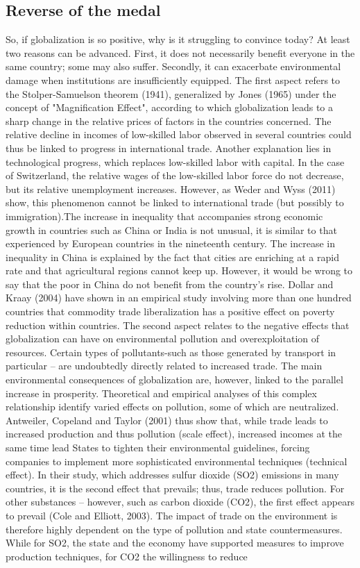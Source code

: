 \documentclass[12pt]{article}
\begin{document}
\subsection{Reverse of the medal}

So, if globalization is so positive, why is it struggling to convince today? At least two reasons can be advanced. First, it does not necessarily benefit everyone in the same country; some may also suffer. Secondly, it can exacerbate environmental damage when institutions are insufficiently equipped. The first aspect refers to the Stolper-Samuelson theorem (1941), generalized by Jones (1965) under the concept of "Magnification Effect", according to which globalization leads to a sharp change in the relative prices of factors in the countries concerned. The relative decline in incomes of low-skilled labor observed in several countries could thus be linked to progress in international trade. Another explanation lies in technological progress, which replaces low-skilled labor with capital. In the case of Switzerland, the relative wages of the low-skilled labor force do not decrease, but its relative unemployment increases. However, as  Weder and Wyss (2011) show, this phenomenon cannot be linked to international trade (but possibly to immigration).The increase in inequality that accompanies strong economic growth in countries such as China or India is not unusual, it is similar to that experienced by European countries in the nineteenth century. The increase in inequality in China is explained by the fact that cities are enriching at a rapid rate and that agricultural regions cannot keep up. However, it would be wrong to say that the poor in China do not benefit from the country's rise. Dollar and Kraay (2004) have shown in an empirical study involving more than one hundred countries that commodity trade liberalization has a positive effect on poverty reduction within countries. The second aspect relates to the negative effects that globalization can have on environmental pollution and overexploitation of resources. Certain types of pollutants-such as those generated by transport in particular – are undoubtedly directly related to increased trade. The main environmental consequences of globalization are, however, linked to the parallel increase in prosperity. Theoretical and empirical analyses of this complex relationship identify varied effects on pollution, some of which are neutralized. Antweiler, Copeland and Taylor (2001) thus show that, while trade leads to increased production and thus pollution (scale effect), increased incomes at the same time lead States to tighten their environmental guidelines, forcing companies to implement more sophisticated environmental techniques (technical effect). In their study, which addresses sulfur dioxide (SO2) emissions in many countries, it is the second effect that prevails; thus, trade reduces pollution. For other substances – however, such as carbon dioxide (CO2), the first effect appears to prevail (Cole and Elliott, 2003). The impact of trade on the environment is therefore highly dependent on the type of pollution and state countermeasures. While for SO2, the state and the economy have supported measures to improve production techniques, for CO2 the willingness to reduce 
\end{document}
